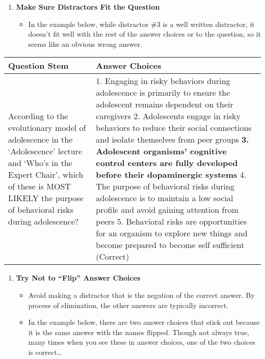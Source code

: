 \documentclass[
]{article}
\providecommand{\tightlist}{%
  \setlength{\itemsep}{0pt}\setlength{\parskip}{0pt}}
\begin{document}
\begin{enumerate}
\def\labelenumi{\arabic{enumi}.}
\setcounter{enumi}{5}
\tightlist
\item
  \textbf{Make Sure Distractors Fit the Question}

  \begin{itemize}
  \tightlist
  \item
    In the example below, while distractor \#3 is a well written distractor, it doesn't fit well with the rest of the answer choices or to the question, so it seems like an obvious wrong answer.
  \end{itemize}
\end{enumerate}

\begin{longtable}[]{@{}ll@{}}
\toprule
\begin{minipage}[b]{0.30\columnwidth}\raggedright
\textbf{Question Stem}\strut
\end{minipage} & \begin{minipage}[b]{0.64\columnwidth}\raggedright
\textbf{Answer Choices}\strut
\end{minipage}\tabularnewline
\midrule
\endhead
\begin{minipage}[t]{0.30\columnwidth}\raggedright
According to the evolutionary model of adolescence in the `Adolescence' lecture and `Who's in the Expert Chair', which of these is MOST LIKELY the purpose of behavioral risks during adolescence?\strut
\end{minipage} & \begin{minipage}[t]{0.64\columnwidth}\raggedright
1. Engaging in risky behaviors during adolescence is primarily to ensure the adolescent remains dependent on their caregivers 2. Adolescents engage in risky behaviors to reduce their social connections and isolate themselves from peer groups \textbf{3. Adolescent organisms' cognitive control centers are fully developed before their dopaminergic systems} 4. The purpose of behavioral risks during adolescence is to maintain a low social profile and avoid gaining attention from peers 5. Behavioral risks are opportunities for an organism to explore new things and become prepared to become self sufficient (Correct)\strut
\end{minipage}\tabularnewline
\bottomrule
\end{longtable}

\begin{enumerate}
\def\labelenumi{\arabic{enumi}.}
\setcounter{enumi}{6}
\tightlist
\item
  \textbf{Try Not to ``Flip'' Answer Choices}

  \begin{itemize}
  \tightlist
  \item
    Avoid making a distractor that is the negation of the correct answer. By process of elimination, the other answers are typically incorrect.
  \item
    In the example below, there are two answer choices that stick out because it is the same answer with the names flipped. Though not always true, many times when you see these in answer choices, one of the two choices is correct\ldots{}
  \end{itemize}
\end{enumerate}
\end{document}
